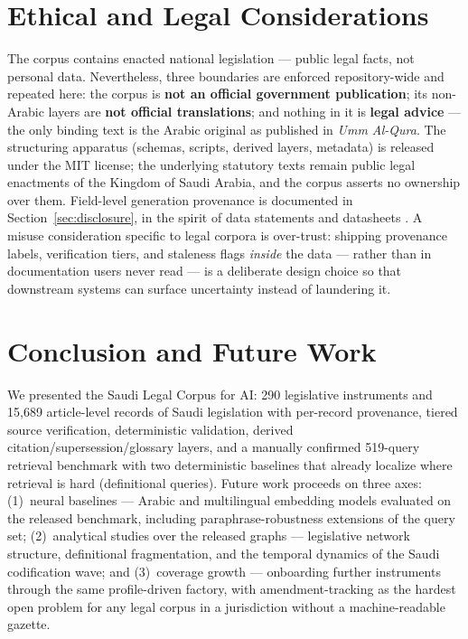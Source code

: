 \documentclass[11pt]{article}
\newcommand{\corpusname}{Saudi Legal Corpus for AI}
\begin{document}
\section{Ethical and Legal Considerations}
\label{sec:ethics}

The corpus contains enacted national legislation --- public legal facts,
not personal data. Nevertheless, three boundaries are enforced
repository-wide and repeated here: the corpus is \textbf{not an official
government publication}; its non-Arabic layers are \textbf{not official
translations}; and nothing in it is \textbf{legal advice} --- the only
binding text is the Arabic original as published in \emph{Umm Al-Qura}. The
structuring apparatus (schemas, scripts, derived layers, metadata) is
released under the MIT license; the underlying statutory texts remain
public legal enactments of the Kingdom of Saudi Arabia, and the corpus
asserts no ownership over them. Field-level generation provenance is
documented in Section~\ref{sec:disclosure}, in the spirit of data
statements and datasheets \citep{bender2018data, gebru2021datasheets}. A
misuse consideration specific to legal corpora is over-trust: shipping
provenance labels, verification tiers, and staleness flags \emph{inside}
the data --- rather than in documentation users never read --- is a
deliberate design choice so that downstream systems can surface uncertainty
instead of laundering it.

\section{Conclusion and Future Work}

We presented the \corpusname: 290 legislative instruments and 15{,}689
article-level records of Saudi legislation with per-record provenance,
tiered source verification, deterministic validation, derived
citation/supersession/glossary layers, and a manually confirmed 519-query
retrieval benchmark with two deterministic baselines that already localize
where retrieval is hard (definitional queries). Future work proceeds on
three axes: (1)~neural baselines --- Arabic and multilingual embedding
models evaluated on the released benchmark, including paraphrase-robustness
extensions of the query set; (2)~analytical studies over the released
graphs --- legislative network structure, definitional fragmentation, and
the temporal dynamics of the Saudi codification wave; and (3)~coverage
growth --- onboarding further instruments through the same profile-driven
factory, with amendment-tracking as the hardest open problem for any legal
corpus in a jurisdiction without a machine-readable gazette.
\end{document}

